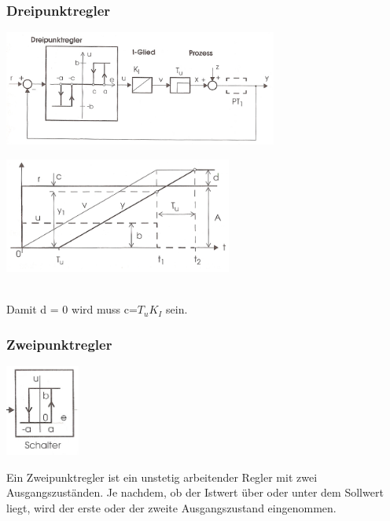 	\subsubsection{Dreipunktregler}
		\begin{minipage}{9cm}
		\includegraphics[width=9cm]{./bilder/Dreipunktregler.jpg}
        \end{minipage}
		\begin{minipage}{7.5cm}
        \includegraphics[width=7.5cm]{./bilder/Dreipunktregler_dia.jpg}
        \end{minipage}\\
		Damit d = 0 wird muss c=$T_u K_I$ sein.
\newpage
		
		
	\subsubsection{Zweipunktregler}
		\begin{minipage}{3cm}
 		\includegraphics[height=3cm]{./bilder/Zweipunktregler.jpg}
        \end{minipage}
		\begin{minipage}{15cm}
        Ein Zweipunktregler ist ein unstetig arbeitender Regler mit zwei
        Ausgangszuständen. Je nachdem, ob der Istwert über oder unter dem
        Sollwert liegt, wird der erste oder der zweite Ausgangszustand
        eingenommen.   
        \end{minipage}

